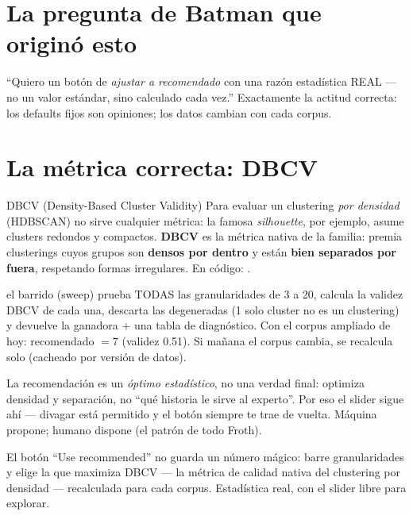\documentclass[11pt,a4paper]{article}
\begin{document}

\section{La pregunta de Batman que originó esto}

``Quiero un botón de \emph{ajustar a recomendado} con una razón estadística REAL — no un
valor estándar, sino calculado cada vez.'' Exactamente la actitud correcta: los defaults
fijos son opiniones; los datos cambian con cada corpus.

\section{La métrica correcta: DBCV}

\begin{concepto}{DBCV (Density-Based Cluster Validity)}
Para evaluar un clustering \emph{por densidad} (HDBSCAN) no sirve cualquier métrica: la
famosa \emph{silhouette}, por ejemplo, asume clusters redondos y compactos. \textbf{DBCV}
es la métrica nativa de la familia: premia clusterings cuyos grupos son \textbf{densos por
dentro} y están \textbf{bien separados por fuera}, respetando formas irregulares.
En código: .
\end{concepto}

\begin{concepto}{el barrido (sweep)}
 prueba TODAS las granularidades de 3 a 20,
calcula la validez DBCV de cada una, descarta las degeneradas (1 solo cluster no es un
clustering) y devuelve la ganadora + una tabla de diagnóstico. Con el corpus ampliado de
hoy: recomendado $= 7$ (validez 0.51). Si mañana el corpus cambia, se recalcula solo
(cacheado por versión de datos).
\end{concepto}

\begin{ojo}
La recomendación es un \emph{óptimo estadístico}, no una verdad final: optimiza densidad y
separación, no ``qué historia le sirve al experto''. Por eso el slider sigue ahí — divagar
está permitido y el botón siempre te trae de vuelta. Máquina propone; humano dispone
(el patrón de todo Froth).
\end{ojo}

\begin{resumen}
El botón ``Use recommended'' no guarda un número mágico: barre granularidades y elige la que
maximiza DBCV — la métrica de calidad nativa del clustering por densidad — recalculada para
cada corpus. Estadística real, con el slider libre para explorar.
\end{resumen}
\end{document}
